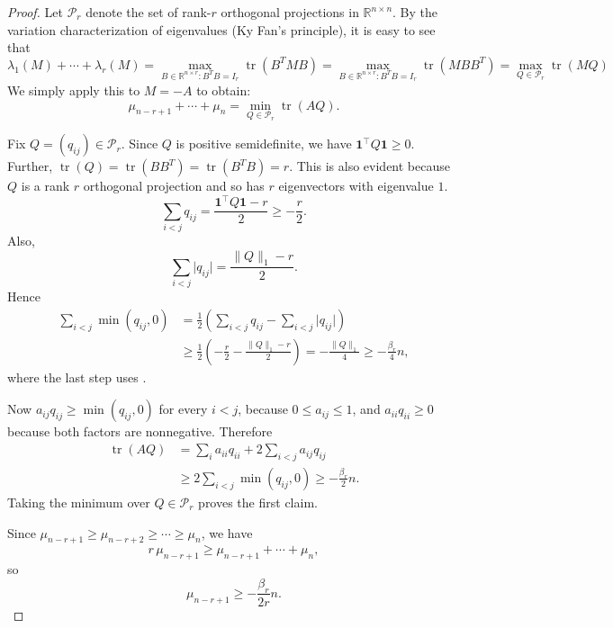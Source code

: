 \documentclass[12pt]{amsart}
\theoremstyle{myremark}
\DeclareMathOperator{\tr}{tr}
\newcommand{\R}{\mathbb{R}}
\newcommand{\1}{\mathbf{1}}
\newcommand{\abs}[1]{\lvert #1\rvert}
\newcommand{\cP}{\mathcal{P}}
\begin{document}
\begin{proof}
Let $\cP_r$ denote the set of rank-$r$ orthogonal projections in $\R^{n\times n}$. By the variation characterization of eigenvalues (Ky Fan's principle), it is easy to see that \[\lambda_1(M) + \cdots + \lambda_r(M) = \max_{B \in \R^{n\times r}: B^T B =  I_r} \tr(B^T M B) = \max_{B \in \R^{n\times r}: B^T B =  I_r} \tr(M BB^T) = \max_{Q \in \mathcal{P}_r} \tr(M Q)\] We simply apply this to $M = -A$ to obtain: 
\[
\mu_{n-r+1}+\cdots+\mu_n=
\min_{Q\in\cP_r} \tr(AQ).
\]




Fix $Q=(q_{ij})\in \cP_r$. Since $Q$ is positive semidefinite, we have $\1^\top Q\1\ge 0$. Further, $\tr(Q)= \tr(BB^T) = \tr(B^TB) = r$. This is also evident because $Q$ is a rank $r$ orthogonal projection and so has $r$ eigenvectors with eigenvalue $1$.
\[
\sum_{i<j} q_{ij}=\frac{\1^\top Q\1-r}{2}\ge -\frac r2.
\]
Also,
\[
\sum_{i<j}\abs{q_{ij}}=\frac{\|Q\|_1-r}{2}.
\]
Hence
\begin{align*}
\sum_{i<j}\min(q_{ij},0)
&=\frac12\left(\sum_{i<j}q_{ij}-\sum_{i<j}\abs{q_{ij}}\right) \\
&\ge \frac12\left(-\frac r2-\frac{\|Q\|_1-r}{2}\right)
 =-\frac{\|Q\|_1}{4}
 \ge -\frac{\beta_r}{4}n,
\end{align*}
where the last step uses .

Now $a_{ij}q_{ij}\ge \min(q_{ij},0)$ for every $i<j$, because $0\le a_{ij}\le 1$, and $a_{ii}q_{ii}\ge 0$ because both factors are nonnegative. Therefore
\begin{align*}
\tr(AQ)
&=\sum_i a_{ii}q_{ii}+2\sum_{i<j} a_{ij}q_{ij} \\
&\ge 2\sum_{i<j}\min(q_{ij},0)
 \ge -\frac{\beta_r}{2}n.
\end{align*}
Taking the minimum over $Q\in \cP_r$ proves the first claim.

Since $\mu_{n-r+1}\ge \mu_{n-r+2}\ge \cdots\ge \mu_n$, we have
\[
r\,\mu_{n-r+1}\ge \mu_{n-r+1}+\cdots+\mu_n,
\]
so
\[
\mu_{n-r+1}\ge -\frac{\beta_r}{2r}n.
\]
\end{proof}
\end{document}
